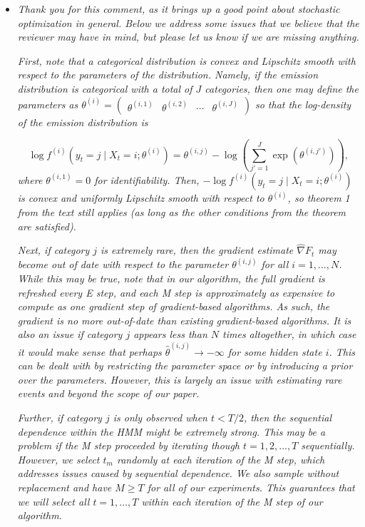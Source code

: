 \documentclass[11pt]{article}
\begin{document}
\begin{itemize}
    \item \textit{Thank you for this comment, as it brings up a good point about stochastic optimization in general. Below we address some issues that we believe that the reviewer may have in mind, but please let us know if we are missing anything.}
    
    \textit{First, note that a categorical distribution is convex and Lipschitz smooth with respect to the parameters of the distribution. Namely, if the emission distribution is categorical with a total of $J$ categories, then one may define the parameters as $\theta^{(i)} = \begin{pmatrix} \theta^{(i,1)} & \theta^{(i,2)} & \cdots & \theta^{(i,J)} \end{pmatrix}$ so that the log-density of the emission distribution is}
    
    $$\log f^{(i)}(y_t = j \mid X_t = i ; \theta^{(i)}) = \theta^{(i,j)} - {\log \left(\sum_{j' = 1}^{J} \exp(\theta^{(i,j')})\right)},$$ 
    \textit{where $\theta^{(i,1)} = 0$ for identifiability. Then, $-\log f^{(i)}(y_t = j \mid X_t = i ; \theta^{(i)})$ is convex and uniformly Lipschitz smooth with respect to $\theta^{(i)}$, so theorem 1 from the text still applies (as long as the other conditions from the theorem are satisfied).}
    
    \textit{Next, if category $j$ is extremely rare, then the gradient estimate $\widehat \nabla F_t$ may become out of date with respect to the parameter $\theta^{(i,j)}$ for all $i = 1,\ldots,N$. While this may be true, note that in our algorithm, the full gradient is refreshed every E step, and each M step is approximately as expensive to compute as one gradient step of gradient-based algorithms. As such, the gradient is no more out-of-date than existing gradient-based algorithms. It is also an issue if category $j$ appears less than $N$ times altogether, in which case it would make sense that perhaps $\hat \theta^{(i,j)} \to -\infty$ for some hidden state $i$. This can be dealt with by restricting the parameter space or by introducing a prior over the parameters. However, this is largely an issue with estimating rare events and beyond the scope of our paper.}
    
    \textit{Further, if category $j$ is only observed when $t < T/2$, then the sequential dependence within the HMM might be extremely strong. This may be a problem if the M step proceeded by iterating though $t = 1,2,\ldots,T$ sequentially. However, we select $t_m$ randomly at each iteration of the M step, which addresses issues caused by sequential dependence. We also sample without replacement and have $M \geq T$ for all of our experiments. This guarantees that we will select all $t = 1,\ldots,T$ within each iteration of the M step of our algorithm.}
    

\end{itemize}
\end{document}
